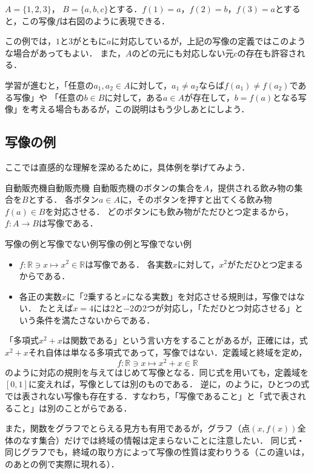 $A=\{ 1,2 ,3 \}$， $B=\{ a, b,c \}$とする．$f(1) = a$，$f(2) = b$，$f(3) = a$とすると，この写像$f$は右図のように表現できる．


この例では，$1$と$3$がともに$a$に対応しているが，上記の写像の定義ではこのような場合があってもよい．
また，$A$のどの元にも対応しない元$c$の存在も許容される．

学習が進むと，「任意の$ a_1 , a_2 \in A$に対して，$ a_1 \ne a_2$ならば$f(a_1) \ne f(a_2)$である写像」や
「任意の$ b \in B$に対して，ある$a \in A$が存在して，$b=f(a)$となる写像」を考える場合もあるが，この説明はもう少しあとにしよう．

\subsection{写像の例}

ここでは直感的な理解を深めるために，具体例を挙げてみよう．

\begin{example}{自動販売機}{自動販売機}
  自動販売機のボタンの集合を$A$，提供される飲み物の集合を$B$とする．
  各ボタン$a \in A$に，そのボタンを押すと出てくる飲み物$f(a) \in B$を対応させる．
  どのボタンにも飲み物がただひとつ定まるから，$f \colon A \to B$は写像である．
\end{example}

\begin{example}{写像の例と写像でない例}{写像の例と写像でない例}
  \begin{itemize}
    \item $f \colon \mathbb{R} \ni x \mapsto x^2 \in \mathbb{R}$は写像である．
          各実数$x$に対して，$x^2$がただひとつ定まるからである．
    \item 各正の実数$x$に「2乗すると$x$になる実数」を対応させる規則は，写像ではない．
          たとえば$x = 4$には$2$と$-2$の2つが対応し，「ただひとつ対応させる」という条件を満たさないからである．
  \end{itemize}
\end{example}

\begin{remark}[「式」と「写像」の違い]
  「多項式$x^2 + x$は関数である」という言い方をすることがあるが，正確には，式$x^2 + x$それ自体は単なる多項式であって，写像ではない．定義域と終域を定め，
  \[
    f \colon \mathbb{R} \ni x \mapsto x^2 + x \in \mathbb{R}
  \]
  のように対応の規則を与えてはじめて写像となる．同じ式を用いても，定義域を$[0, 1]$に変えれば，写像としては別のものである．
  逆に，のように，ひとつの式では表されない写像も存在する．すなわち，「写像であること」と「式で表されること」は別のことがらである．

  また，関数をグラフでとらえる見方も有用であるが，グラフ（点$(x, f(x))$全体のなす集合）だけでは終域の情報は定まらないことに注意したい．
  同じ式・同じグラフでも，終域の取り方によって写像の性質は変わりうる（この違いは，のあとの例で実際に現れる）．
\end{remark}


